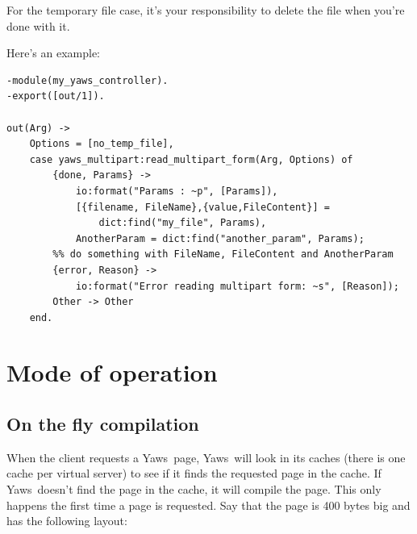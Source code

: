 \documentclass[11pt,oneside,english]{book}
\newcommand{\Yaws}            %
        {{\sc Yaws}}
\begin{document}
For the temporary file case, it's your responsibility to delete the
file when you're done with it.

Here's an example:

\begin{verbatim}
-module(my_yaws_controller).
-export([out/1]).

out(Arg) ->
    Options = [no_temp_file],
    case yaws_multipart:read_multipart_form(Arg, Options) of
        {done, Params} -> 
            io:format("Params : ~p", [Params]),
            [{filename, FileName},{value,FileContent}] =
                dict:find("my_file", Params),
            AnotherParam = dict:find("another_param", Params);
        %% do something with FileName, FileContent and AnotherParam
        {error, Reason} ->
            io:format("Error reading multipart form: ~s", [Reason]);
        Other -> Other
    end.
\end{verbatim}


\chapter{Mode of operation}

\section{On the fly compilation}
When the client requests a \Yaws\  page, \Yaws\  will look in its caches
(there is one cache per virtual server) to see if it finds the
requested page in the cache. If \Yaws\  doesn't find the page in the
cache, it will compile the page. This only happens the first time a
page is requested.
Say that the page is 400 bytes big and has the following layout:
\end{document}
